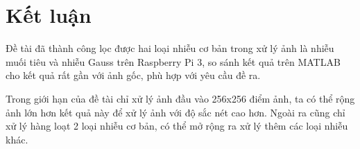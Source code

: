 \pagebreak
\section{Kết luận}

Đề tài đã thành công lọc được hai loại nhiễu cơ bản trong xử lý ảnh là nhiễu muối tiêu và nhiễu Gauss trên Raspberry Pi 3, 
so sánh kết quả trên MATLAB cho kết quả rất gần với ảnh gốc, 
phù hợp với yêu cầu đề ra.


Trong giới hạn của đề tài chỉ xử lý ảnh đầu vào 256x256 điểm ảnh, 
ta có thể rộng ảnh lớn hơn kết quả này để xử lý ảnh với độ sắc nét cao hơn.
Ngoài ra cũng chỉ xử lý hàng loạt 2 loại nhiễu cơ bản, có thể mở rộng ra xử lý thêm các loại nhiễu khác.